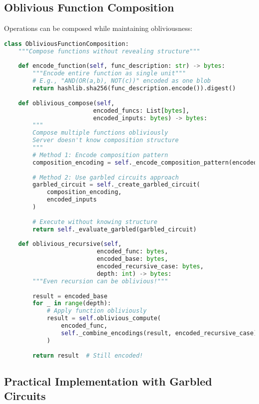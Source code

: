 \subsection{Oblivious Function Composition}

Operations can be composed while maintaining obliviousness:

\begin{lstlisting}[language=Python, caption={Composing oblivious operations}]
class ObliviousFunctionComposition:
    """Compose functions without revealing structure"""
    
    def encode_function(self, func_description: str) -> bytes:
        """Encode entire function as single unit"""
        # E.g., "AND(OR(a,b), NOT(c))" encoded as one blob
        return hashlib.sha256(func_description.encode()).digest()
    
    def oblivious_compose(self, 
                         encoded_funcs: List[bytes],
                         encoded_inputs: bytes) -> bytes:
        """
        Compose multiple functions obliviously
        Server doesn't know composition structure
        """
        # Method 1: Encode composition pattern
        composition_encoding = self._encode_composition_pattern(encoded_funcs)
        
        # Method 2: Use garbled circuits approach
        garbled_circuit = self._create_garbled_circuit(
            composition_encoding,
            encoded_inputs
        )
        
        # Execute without knowing structure
        return self._evaluate_garbled(garbled_circuit)
    
    def oblivious_recursive(self,
                          encoded_func: bytes,
                          encoded_base: bytes,
                          encoded_recursive_case: bytes,
                          depth: int) -> bytes:
        """Even recursion can be oblivious!"""
        
        result = encoded_base
        for _ in range(depth):
            # Apply function obliviously
            result = self.oblivious_compute(
                encoded_func,
                self._combine_encodings(result, encoded_recursive_case)
            )
        
        return result  # Still encoded!
\end{lstlisting}

\subsection{Practical Implementation with Garbled Circuits}

